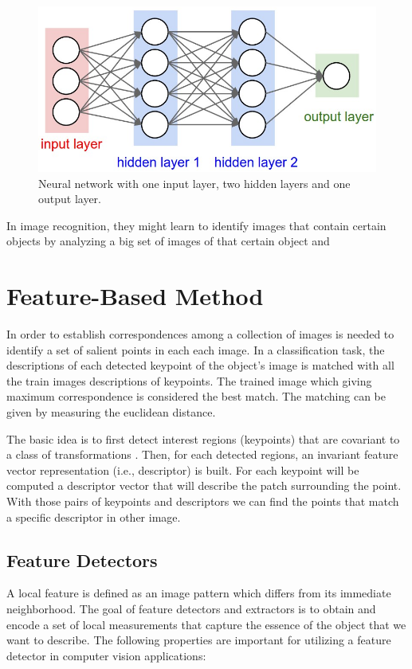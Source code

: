 \documentclass[9pt,shortpaper,twoside,web]{ieeecolor}
\begin{document}
\begin{figure}[htb]
\centerline{\includegraphics[width=\columnwidth]{res/fig/ann.jpg}}
\caption{Neural network with one input layer, two hidden layers and one output layer.}
\label{fig1}
\end{figure}

In image recognition, they might learn to identify images that contain certain objects by analyzing a big set of images of that certain object and

\section{Feature-Based Method}

In order to establish correspondences among a collection of images is needed to identify a set of salient points in each each image. In a classification task, the descriptions of each detected keypoint of the object's image is matched with all the train images descriptions of keypoints. The trained image which giving maximum correspondence is considered the best match. The matching can be given by measuring the euclidean distance.

The basic idea is to first detect interest regions (keypoints) that are covariant to a class of transformations \cite{b2}. Then, for each detected regions, an invariant feature vector representation (i.e., descriptor) is built. For each keypoint will be computed a descriptor vector that will describe the patch surrounding the point. With those pairs of keypoints and descriptors we can find the points that match a specific descriptor in other image.

\subsection{Feature Detectors}

A local feature is defined as an image pattern which differs from its immediate neighborhood. The goal of feature detectors and extractors is to obtain and encode a set of local measurements that capture the essence of the object that we want to describe. The following properties are important for utilizing a feature detector in computer vision applications:
\end{document}
